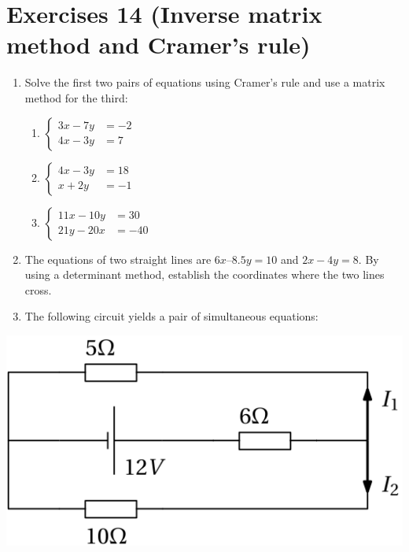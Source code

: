 \documentclass[
  12pt,
  oneside]{book}
\providecommand{\tightlist}{%
  \setlength{\itemsep}{0pt}\setlength{\parskip}{0pt}}
\theoremstyle{definition}
\theoremstyle{definition}
\theoremstyle{definition}
\theoremstyle{definition}
\theoremstyle{remark}
\begin{document}
\chapter*{Exercises 14 (Inverse matrix method and Cramer's rule)}\label{exercises-14-inverse-matrix-method-and-cramers-rule}

\begin{enumerate}
\def\labelenumi{\arabic{enumi}.}
\item
  Solve the first two pairs of equations using Cramer's rule and use a matrix method for the third:

  \begin{enumerate}
  \def\labelenumii{\roman{enumii})}
  \tightlist
  \item
    \(\left\{\begin{aligned}3x-7y&=-2\\4x-3y&=7\end{aligned}\right.\)
  \item
    \(\left\{\begin{aligned}4x-3y&=18\\ x+2y&=-1\end{aligned}\right.\)
  \item
    \(\left\{\begin{aligned}11x-10y&=30\\21y-20x&=-40\end{aligned}\right.\)
  \end{enumerate}
\item
  The equations of two straight lines are \(6x – 8.5y = 10\) and \(2x - 4y = 8\). By using a determinant method, establish the coordinates where the two lines cross.
\item
  The following circuit yields a pair of simultaneous equations:
\end{enumerate}

\begin{center}\includegraphics{t13-circuit} \end{center}
\end{document}
